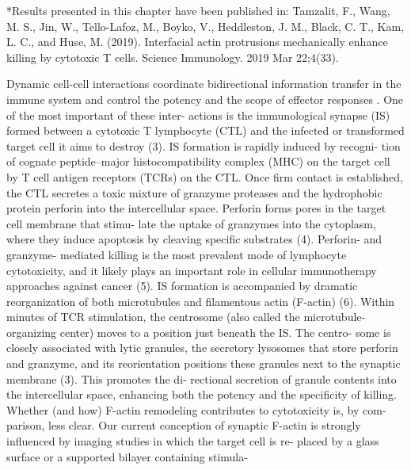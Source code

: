 *Results presented in this chapter have been published in: Tamzalit, F., Wang, M. S., Jin, W., Tello-Lafoz, M., Boyko, V., Heddleston, J. M., Black, C. T., Kam, L. C., and Huse, M. (2019). Interfacial actin protrusions mechanically enhance killing by cytotoxic T cells. Science Immunology. 2019 Mar 22;4(33).

Dynamic cell-cell interactions coordinate bidirectional information transfer in the immune system and control the potency and the scope of effector responses \cite{Batista2013}. One of the most important of these inter- actions is the immunological synapse (IS) formed between a cytotoxic T lymphocyte (CTL) and the infected or transformed target cell it aims to destroy \cite{Dustin2010} (3). IS formation is rapidly induced by recogni- tion of cognate peptide–major histocompatibility complex (MHC) on the target cell by T cell antigen receptors (TCRs) on the CTL. Once firm contact is established, the CTL secretes a toxic mixture of granzyme proteases and the hydrophobic protein perforin into the intercellular space. Perforin forms pores in the target cell membrane that stimu- late the uptake of granzymes into the cytoplasm, where they induce apoptosis by cleaving specific substrates (4). Perforin- and granzyme- mediated killing is the most prevalent mode of lymphocyte cytotoxicity, and it likely plays an important role in cellular immunotherapy approaches against cancer (5).
IS formation is accompanied by dramatic reorganization of both microtubules and filamentous actin (F-actin) (6). Within minutes of TCR stimulation, the centrosome (also called the microtubule- organizing center) moves to a position just beneath the IS. The centro- some is closely associated with lytic granules, the secretory lysosomes that store perforin and granzyme, and its reorientation positions these granules next to the synaptic membrane (3). This promotes the di- rectional secretion of granule contents into the intercellular space, enhancing both the potency and the specificity of killing. Whether (and how) F-actin remodeling contributes to cytotoxicity is, by com- parison, less clear. Our current conception of synaptic F-actin is strongly influenced by imaging studies in which the target cell is re- placed by a glass surface or a supported bilayer containing stimula-

